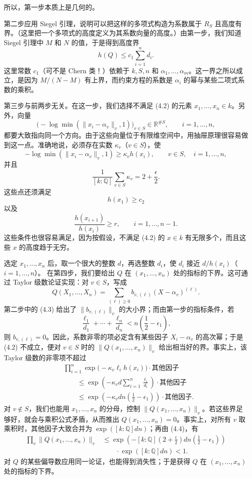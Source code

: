所以，第一步本质上是几何的。

第二步应用 Siegel 引理，说明可以把这样的多项式构造为系数属于 $R_S$ 且高度有界。（这里把一个多项式的高度定义为其系数向量的高度。）由第一步，我们知道 Siegel 引理中 $M$ 和 $N$ 的值，于是得到高度界
\begin{equation*}
h(Q)\le c_1\sum_{i=1}^n d_i.\tag{4.3}
\end{equation*}
这里常数 $c_1$（可不是 Chern 类！）依赖于 $k,S,n$ 和 $\alpha_1,\ldots,\alpha_m$。这一界之所以成立，是因为 $M/(N-M)$ 有上界，而约束方程的系数是 $\alpha_i$ 的幂与某些二项式系数的乘积。

第三步与前两步无关。在这一步，我们选择不满足 (4.2) 的元素 $x_1,\ldots,x_n\in k$。另外，向量
\[
\bigl(-\log\min(\|x_i-\alpha_v\|_v,1)\bigr)_{v\in S}\in\mathbb R^{\#S},
\qquad i=1,\ldots,n,
\]
都要大致指向同一个方向。由于这些向量位于有限维空间中，用抽屉原理很容易做到这一点。准确地说，必须存在实数 $\kappa_v$（$v\in S$），使
\[
-\log\min(\|x_i-\alpha_v\|_v,1)\ge\kappa_vh(x_i),
\qquad v\in S,\quad i=1,\ldots,n,
\]
并且
\begin{equation*}
\frac1{[k:\mathbb Q]}\sum_{v\in S}\kappa_v=2+\frac\epsilon2.\tag{4.4}
\end{equation*}
这些点还须满足
\[
h(x_1)\ge c_2
\]
以及
\[
\frac{h(x_{i+1})}{h(x_i)}\ge r,\qquad i=1,\ldots,n-1.
\]
这些条件也很容易满足，因为按假设，不满足 (4.2) 的 $x\in k$ 有无限多个，而且这些 $x$ 的高度趋于无穷。

选定 $x_1,\ldots,x_n$ 后，取一个很大的整数 $d$，再选整数 $d_i$，使 $d_i$ 接近 $d/h(x_i)$（$i=1,\ldots,n$）。
在第四步，我们要给出 $Q$ 在 $(x_1,\ldots,x_n)$ 处的指标的下界。这可通过 Taylor 级数论证实现：对 $v\in S$，写成
\[
Q(X_1,\ldots,X_n)=\sum_{(\ell)\ge0}b_{v,(\ell)}(X-\alpha_v)^{(\ell)}.
\]
第二步中的 (4.3) 给出了 $\|b_{v,(\ell)}\|_v$ 的大小界；而由第一步的指标条件，若
\[
\frac{\ell_1}{d_1}+\cdots+\frac{\ell_n}{d_n}
<n\left(\frac12-\epsilon_1\right),
\]
则 $b_{v,(\ell)}=0$。因此，系数非零的项必定含有某些因子 $X_i-\alpha_v$ 的高次幂；于是 (4.2) 不成立，便对 $v\in S$ 时的 $\|Q(x_1,\ldots,x_n)\|_v$ 给出相当好的界。事实上，该 Taylor 级数的非零项不超过
\begin{align*}
&\prod_{i=1}^n\exp\bigl(-\kappa_v\ell_i h(x_i)\bigr)\cdot\text{其他因子}\\
&\qquad\le\exp\left(-\kappa_vd\sum_{i=1}^n\frac{\ell_i}{d_i}\right)\cdot\text{其他因子}\\
&\qquad\le\exp\left(-\kappa_vdn\left(\tfrac12-\epsilon_1\right)\right)\cdot\text{其他因子}.
\end{align*}
对 $v\notin S$，我们也能用 $x_1,\ldots,x_n$ 的分母，控制 $\|Q(x_1,\ldots,x_n)\|_v$。若这些界足够好，就会与乘积公式矛盾，从而推出 $Q(x_1,\ldots,x_n)=0$。事实上，对所有 $v$ 取乘积时，其他因子大致合并为 $\exp([k:\mathbb Q]dn)$；再由 (4.4)，有
\begin{align*}
\prod_v\|Q(x_1,\ldots,x_n)\|_v
&\le\exp\left(-[k:\mathbb Q]\left(2+\tfrac\epsilon2\right)dn\left(\tfrac12-\epsilon_1\right)\right)\\
&\qquad\cdot\exp([k:\mathbb Q]dn)<1.
\end{align*}
对 $Q$ 的某些偏导数应用同一论证，也能得到消失性；于是获得 $Q$ 在 $(x_1,\ldots,x_n)$ 处的指标的下界。

